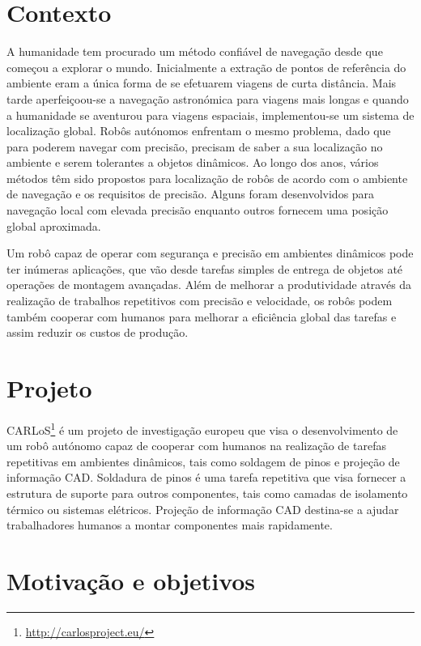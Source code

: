 \documentclass[9pt,a4paper]{extarticle}
\begin{document}
\begin{multicols}{2}

\section{Contexto}

A humanidade tem procurado um método confiável de navegação desde que começou a explorar o mundo. Inicialmente a extração de pontos de referência do ambiente eram a única forma de se efetuarem viagens de curta distância. Mais tarde aperfeiçoou-se a navegação astronómica para viagens mais longas e quando a humanidade se aventurou para viagens espaciais, implementou-se um sistema de localização global. Robôs autónomos enfrentam o mesmo problema, dado que para poderem navegar com precisão, precisam de saber a sua localização no ambiente e serem tolerantes a objetos dinâmicos. Ao longo dos anos, vários métodos têm sido propostos para localização de robôs de acordo com o ambiente de navegação e os requisitos de precisão. Alguns foram desenvolvidos para navegação local com elevada precisão enquanto outros fornecem uma posição global aproximada.

Um robô capaz de operar com segurança e precisão em ambientes dinâmicos pode ter inúmeras aplicações, que vão desde tarefas simples de entrega de objetos até operações de montagem avançadas. Além de melhorar a produtividade através da realização de trabalhos repetitivos com precisão e velocidade, os robôs podem também cooperar com humanos para melhorar a eficiência global das tarefas e assim reduzir os custos de produção.


\section{Projeto}

CARLoS\footnote{\url{http://carlosproject.eu/}} é um projeto de investigação europeu que visa o desenvolvimento de um robô autónomo capaz de cooperar com humanos na realização de tarefas repetitivas em ambientes dinâmicos, tais como soldagem de pinos e projeção de informação CAD. Soldadura de pinos é uma tarefa repetitiva que visa fornecer a estrutura de suporte para outros componentes, tais como camadas de isolamento térmico ou sistemas elétricos. Projeção de informação CAD destina-se a ajudar trabalhadores humanos a montar componentes mais rapidamente.


\section{Motivação e objetivos}


\end{multicols}
\end{document}
